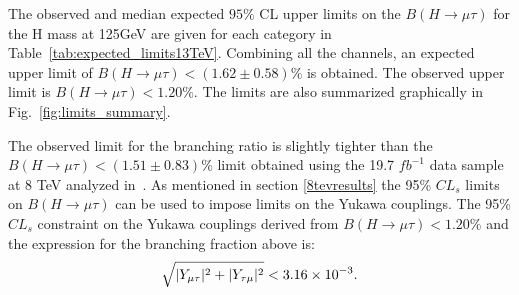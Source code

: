 \documentclass[oneside, letterpaper, oldfontcommands]{memoir}
\DeclarePairedDelimiter{\abs}{\lvert}{\rvert}
\begin{document}
The observed and median expected $95\%$ CL upper limits on the $B(H \rightarrow \mu \tau )$ for the H mass at 125GeV are given for each category
in Table~\ref{tab:expected_limits13TeV}.  Combining all
the channels, an expected upper limit of $B(H \rightarrow \mu \tau )<(1.62 \pm 0.58)\%$ is obtained.
The observed upper limit is $B(H \rightarrow \mu \tau ) < 1.20\%$.
The limits are also  summarized graphically  in
Fig.~\ref{fig:limits_summary}.

The observed limit for the branching ratio is slightly tighter than the $B(H \rightarrow \mu \tau )<(1.51 \pm 0.83)\%$ limit obtained using the 19.7 $fb^{-1}$ data sample at 8 TeV analyzed in~\cite{Khachatryan:2015kon}. As mentioned in section \ref{8tevresults} the 95\% $CL_{s}$ limits on $B(H\rightarrow\mu\tau)$ can be used to impose limits on the Yukawa couplings. The 95\% $CL_{s}$ constraint on the Yukawa couplings derived from $B(H \rightarrow \mu \tau )<1.20\%$ and the expression for the branching fraction above is:\begin{equation*}
\sqrt{\abs{Y_{\mu\tau}}^{2}+\abs{Y_{\tau\mu}}^{2}}<3.16\times 10^{-3}.
\end{equation*}
\end{document}
